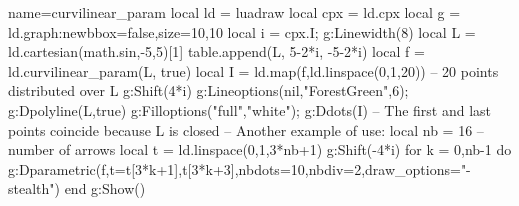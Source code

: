 \begin{luadraw}{name=curvilinear_param}
local ld = luadraw
local cpx = ld.cpx
local g = ld.graph:new{bbox=false,size={10,10}}
local i = cpx.I; g:Linewidth(8)
local L = ld.cartesian(math.sin,-5,5)[1]
table.append(L, {5-2*i, -5-2*i})
local f = ld.curvilinear_param(L, true)
local I = ld.map(f,ld.linspace(0,1,20)) -- 20 points distributed over L
g:Shift(4*i)
g:Lineoptions(nil,"ForestGreen",6); g:Dpolyline(L,true)
g:Filloptions("full","white"); g:Ddots(I) -- The first and last points coincide because L is closed
-- Another example of use:
local nb = 16 -- number of arrows
local t = ld.linspace(0,1,3*nb+1)
g:Shift(-4*i)
for k = 0,nb-1 do
g:Dparametric(f,{t={t[3*k+1],t[3*k+3]},nbdots=10,nbdiv=2,draw_options="-stealth"})
end
g:Show()
\end{luadraw}

